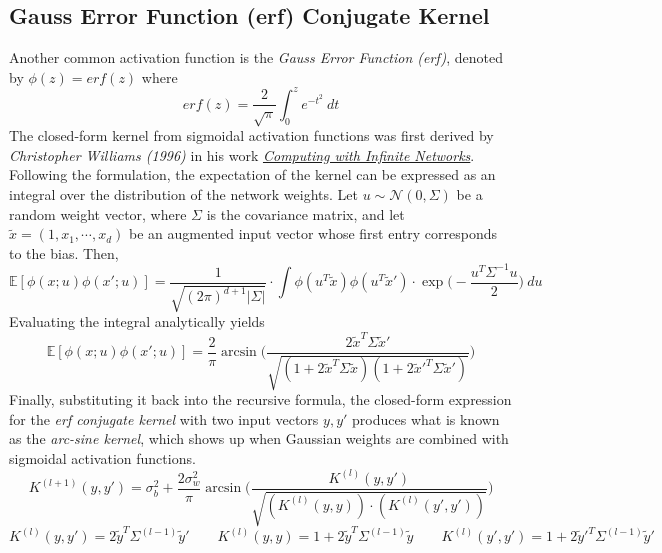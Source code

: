 \documentclass{article}
\newcommand{\EX}{\mathbb{E}}
\begin{document}
\subsection{Gauss Error Function (erf) Conjugate Kernel}
Another common activation function is the \textit{Gauss Error Function (erf)}, denoted by $\phi(z)=erf(z)$ where
$$erf(z)=\frac{2}{\sqrt{\pi}}\int_0^ze^{-t^2}~dt$$
The closed-form kernel from sigmoidal activation functions was first derived by \textit{Christopher Williams (1996)} in his work \href{https://papers.nips.cc/paper/1996/hash/ae5e3ce40e0404a45ecacaaf05e5f735-Abstract.html}{\textit{Computing with Infinite Networks}}. Following the formulation, the expectation of the kernel can be expressed as an integral over the distribution of the network weights. Let $u\sim \mathcal{N}(0,\Sigma)$ be a random weight vector, where $\Sigma$ is the covariance matrix, and let $\tilde{x}=(1,x_1,\cdots,x_d)$ be an augmented input vector whose first entry corresponds to the bias. Then,
$$\EX[\phi(x;u)\phi(x';u)]=\frac{1}{\sqrt{(2\pi)^{d+1}|\Sigma|}}\cdot \int\phi(u^T\tilde{x})\phi(u^T\tilde{x}')\cdot \exp\Bigg(-\frac{u^T\Sigma^{-1}u}{2}\Bigg)~du$$
Evaluating the integral analytically yields
$$\EX[\phi(x;u)\phi(x';u)]=\frac{2}{\pi}\arcsin\Bigg(\frac{2\tilde{x}^T\Sigma \tilde{x}'}{\sqrt{(1+2\tilde{x}^T\Sigma \tilde{x})(1+2\tilde{x}'^T\Sigma \tilde{x}')}}\Bigg)$$
Finally, substituting it back into the recursive formula, the closed-form expression for the \textit{erf conjugate kernel} with two input vectors $y,y'$ produces what is known as the \textit{arc-sine kernel}, which shows up when Gaussian weights are combined with sigmoidal activation functions.
$$K^{(l+1)}(y,y')=\sigma_b^2+\frac{2\sigma_w^2}{\pi}\arcsin\Bigg(\frac{K^{(l)}(y,y')}{\sqrt{(K^{(l)}(y,y))\cdot (K^{(l)}(y',y'))}}\Bigg)$$
$$K^{(l)}(y,y')=2\tilde{y}^T\Sigma^{(l-1)} \tilde{y}'\qquad K^{(l)}(y,y)=1+2\tilde{y}^T\Sigma^{(l-1)} \tilde{y}\qquad K^{(l)}(y',y')=1+2\tilde{y}'^T\Sigma^{(l-1)} \tilde{y}'$$
\end{document}

